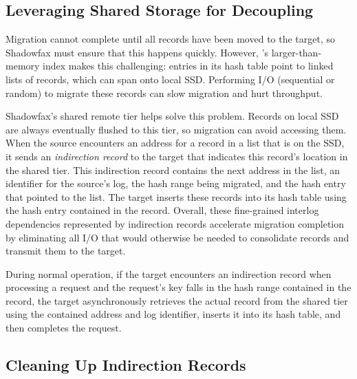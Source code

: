 
\subsection{Leveraging Shared Storage for Decoupling}
\label{sec:design:indirection}

Migration cannot complete until all records have been
moved to the target, so Shadowfax must ensure that this
happens quickly.
%
However, \faster's larger-than-memory index makes this challenging:
entries in its hash table point to linked lists of records, which can
span onto local SSD.
%
Performing I/O (sequential or random) to migrate these records
can slow migration and hurt throughput.

Shadowfax's shared remote tier helps solve this problem.
%
Records on local SSD are always eventually flushed to this tier, so migration
can avoid accessing them.
%
When the source encounters an address for a record in a list that is on the
SSD, it sends an \emph{indirection record} to the target that indicates this
record's location in the shared tier.
%
This indirection record contains the next address in the list, an identifier for the
source's log, the hash range being migrated, and the hash entry that
pointed to the list.
%
The target inserts these records into its hash table using the hash
entry contained in the record.
%
%
Overall, these fine-grained interlog dependencies represented by indirection
records accelerate migration completion by eliminating all I/O
that would otherwise be needed to consolidate records and transmit them
to the target.

During normal operation, if the target encounters an indirection record
when processing a request and the request's key falls in the
hash range contained in the record, the target asynchronously retrieves
the actual record from the
shared tier using the contained address and log identifier, inserts it
into its hash table, and then completes the request.

\subsection{Cleaning Up Indirection Records}

